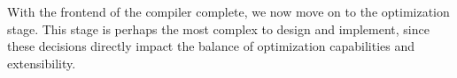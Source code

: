 \documentclass{article}
\begin{document}
With the frontend of the compiler complete, we now move on to the optimization stage. This stage is perhaps the most complex to design and implement, since these decisions directly impact the balance of optimization capabilities and extensibility.





\end{document}
